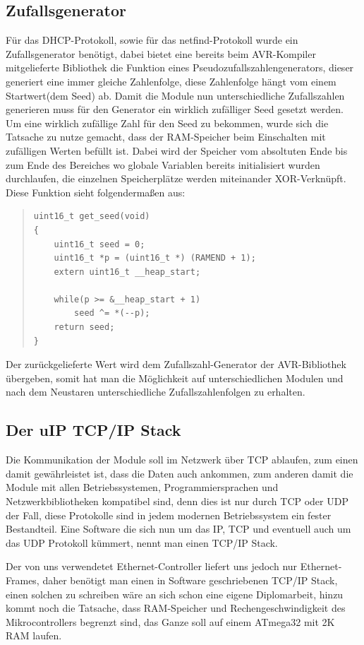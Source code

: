 \documentclass[a4paper,14pt,headsepline]{scrartcl}
\begin{document}
\subsection{Zufallsgenerator}
Für das DHCP-Protokoll, sowie für das netfind-Protokoll wurde ein Zufallsgenerator benötigt, dabei bietet eine bereits beim AVR-Kompiler mitgelieferte Bibliothek die Funktion eines Pseudozufallszahlengenerators, dieser generiert eine immer gleiche Zahlenfolge, diese Zahlenfolge hängt vom einem Startwert(dem Seed) ab. Damit die Module nun unterschiedliche Zufallszahlen generieren muss für den Generator ein wirklich zufälliger Seed gesetzt werden. Um eine wirklich zufällige Zahl für den Seed zu bekommen, wurde sich die Tatsache zu nutze gemacht, dass der RAM-Speicher beim Einschalten mit zufälligen Werten befüllt ist. Dabei wird der Speicher vom absoltuten Ende bis zum Ende des Bereiches wo globale Variablen bereits initialisiert wurden durchlaufen, die einzelnen Speicherplätze werden miteinander XOR-Verknüpft. Diese Funktion sieht folgendermaßen aus:
\begin{quote}
\begin{verbatim}
uint16_t get_seed(void)
{
    uint16_t seed = 0;
    uint16_t *p = (uint16_t *) (RAMEND + 1);
    extern uint16_t __heap_start;

    while(p >= &__heap_start + 1)
        seed ^= *(--p);
    return seed;
}
\end{verbatim}
\end{quote}

Der zurückgelieferte Wert wird dem Zufallszahl-Generator der AVR-Bibliothek übergeben, somit hat man die Möglichkeit auf unterschiedlichen Modulen und nach dem Neustaren unterschiedliche Zufallszahlenfolgen zu erhalten.


\subsection{Der uIP TCP/IP Stack}
Die Kommunikation der Module soll im Netzwerk über TCP ablaufen, zum einen damit gewährleistet ist, dass die Daten auch ankommen, zum anderen damit die Module mit allen Betriebssystemen, Programmiersprachen und Netzwerkbibliotheken kompatibel sind, denn dies ist nur durch TCP oder UDP der Fall, diese Protokolle sind in jedem modernen Betriebssystem ein fester Bestandteil. Eine Software die sich nun um das IP, TCP und eventuell auch um das UDP Protokoll kümmert, nennt man einen TCP/IP Stack.

Der von uns verwendetet Ethernet-Controller liefert uns jedoch nur Ethernet-Frames, daher benötigt man einen in Software geschriebenen TCP/IP Stack, einen solchen zu schreiben wäre an sich schon eine eigene Diplomarbeit, hinzu kommt noch die Tatsache, dass RAM-Speicher und Rechengeschwindigkeit des Mikrocontrollers begrenzt sind, das Ganze soll auf einem ATmega32 mit 2K RAM laufen.
\end{document}
